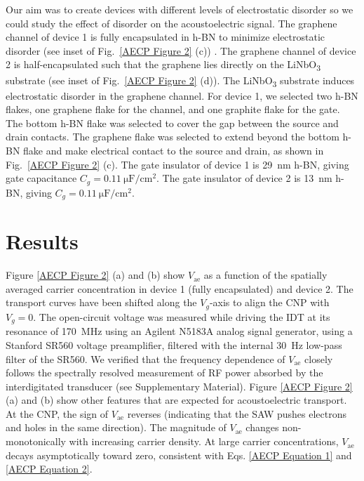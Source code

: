 \documentclass[double,12pt,1in,seploa]{beavtex}
\let\Oldsection\section
\renewcommand{\section}{\FloatBarrier\Oldsection}
\begin{document}
Our aim was to create devices with different levels of electrostatic disorder so we could study the effect of disorder on the acoustoelectric signal. The graphene channel of device 1 is fully encapsulated in h-BN to minimize electrostatic disorder (see inset of Fig.\ \ref{AECP Figure 2} (c)) \cite{dean_boron_2010}. The graphene channel of device 2 is half-encapsulated such that the graphene lies directly on the LiNbO\textsubscript{3} substrate (see inset of Fig.\ \ref{AECP Figure 2} (d)). The LiNbO\textsubscript{3} substrate induces electrostatic disorder in the graphene channel. For device 1, we selected two h-BN flakes, one graphene flake for the channel, and one graphite flake for the gate. The bottom h-BN flake was selected to cover the gap between the source and drain contacts. The graphene flake was selected to extend beyond the bottom h-BN flake and make electrical contact to the source and drain, as shown in Fig.\ \ref{AECP Figure 2} (c). The gate insulator of device 1 is \SI{29}{\nano\meter} h-BN, giving gate capacitance $C_g = \SI{0.11}{\micro\farad/\centi\meter^2}$. The gate insulator of device 2 is \SI{13}{\nano\meter} h-BN, giving $C_g = \SI{0.11}{\micro\farad/\centi\meter^2}$. 

\section{Results} \label{AE charge pumping results}

Figure \ref{AECP Figure 2} (a) and (b) show $V_{\mathrm{ae}}$ as a function of the spatially averaged carrier concentration in device 1 (fully encapsulated) and device 2. The transport curves have been shifted along the $V_g$-axis to align the CNP with $V_g=0$. The open-circuit voltage was measured while driving the IDT at its resonance of \SI{170}{\mega\hertz} using an Agilent N5183A analog signal generator, using a Stanford SR560 voltage preamplifier, filtered with the internal \SI{30}{\hertz} low-pass filter of the SR560. We verified that the frequency dependence of $V_{\mathrm{ae}}$ closely follows the spectrally resolved measurement of RF power absorbed by the interdigitated transducer (see Supplementary Material). Figure \ref{AECP Figure 2} (a) and (b) show other features that are expected for acoustoelectric transport. At the CNP, the sign of $V_{\mathrm{ae}}$ reverses (indicating that the SAW pushes electrons and holes in the same direction). The magnitude of $V_{\mathrm{ae}}$ changes non-monotonically with increasing carrier density. At large carrier concentrations, $V_{\mathrm{ae}}$ decays asymptotically toward zero, consistent with Eqs. \ref{AECP Equation 1} and \ref{AECP Equation 2}. 
\end{document}
